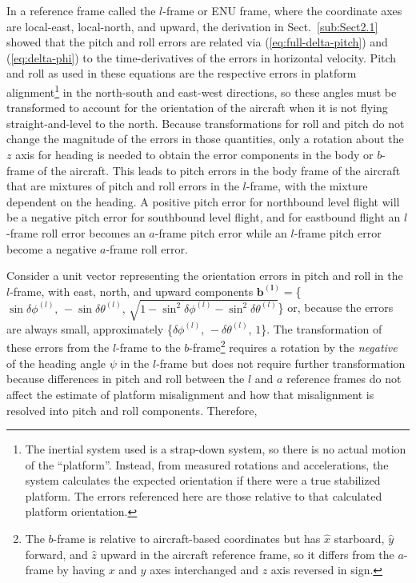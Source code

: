 \documentclass[english,british,amtd,bookmarks=false,unicode=true]{copernicus}\usepackage[]{graphicx}\usepackage[]{color}
\begin{document}
In a reference frame called the $l$-frame or ENU frame, where the
coordinate axes are local-east, local-north, and upward, the derivation
in Sect.~\ref{sub:Sect2.1} showed that the pitch and roll errors
are related via (\ref{eq:full-delta-pitch}) and (\ref{eq:delta-phi})
to the time-derivatives of the errors in horizontal velocity. Pitch
and roll as used in these equations are the respective errors in platform
alignment\footnote{The inertial system used is a strap-down system, so there is no actual
motion of the ``platform''. Instead, from measured rotations and
accelerations, the system calculates the expected orientation if there
were a true stabilized platform. The errors referenced here are those
relative to that calculated platform orientation.} in the north-south and east-west directions, so these angles must
be transformed to account for the orientation of the aircraft when
it is not flying straight-and-level to the north. Because transformations
for roll and pitch do not change the magnitude of the errors in those
quantities, only a rotation about the $z$ axis for heading is needed
to obtain the error components in the body or $b$-frame of the aircraft.
This leads to pitch errors in the body frame of the aircraft that
are mixtures of pitch and roll errors in the $l$-frame, with the
mixture dependent on the heading. A positive pitch error for northbound
level flight will be a negative pitch error for southbound level flight,
and for eastbound flight an $l$-frame roll error becomes an $a$-frame
pitch error while an $l$-frame pitch error become a negative $a$-frame
roll error. 

Consider a unit vector representing the orientation errors in pitch
and roll in the $l$-frame, with east, north, and upward components
$\mathbf{b^{(l)}=}$\{$\sin\delta\phi^{(l)},\,-\sin\delta\theta^{(l)},\,\sqrt{1-\sin^{2}\delta\phi^{(l)}-\sin^{2}\delta\theta^{(l)}}$\}
or, because the errors are always small, approximately \{$\delta\phi^{(l)},\,-\delta\theta^{(l)},\,1$\}.
The transformation of these errors from the $l$-frame to the $b$-frame\footnote{The $b$-frame is relative to aircraft-based coordinates but has $\hat{x}$
starboard, $\hat{y}$ forward, and $\hat{z}$ upward in the aircraft
reference frame, so it differs from the $a$-frame by having $x$
and $y$ axes interchanged and $z$ axis reversed in sign.} requires a rotation by the \emph{negative} of the heading angle $\psi$
in the $l$-frame but does not require further transformation because
differences in pitch and roll between the $l$ and $a$ reference
frames do not affect the estimate of platform misalignment and how
that misalignment is resolved into pitch and roll components. Therefore, 
\end{document}
